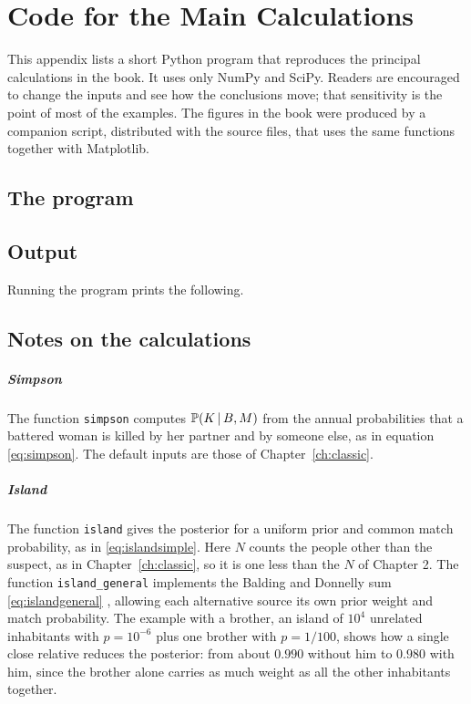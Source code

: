 \chapter{Code for the Main Calculations}
\label{app:code}

This appendix lists a short Python program that reproduces the principal calculations in the book. It uses only NumPy and SciPy. Readers are encouraged to change the inputs and see how the conclusions move; that sensitivity is the point of most of the examples. The figures in the book were produced by a companion script, distributed with the source files, that uses the same functions together with Matplotlib.

\section{The program}



\section{Output}

Running the program prints the following.



\section{Notes on the calculations}

\paragraph{Simpson} The function \texttt{simpson} computes $\mathbb{P}(K\,\vert\, B, M)$ from the annual probabilities that a battered woman is killed by her partner and by someone else, as in equation \eqref{eq:simpson}. The default inputs are those of Chapter~\ref{ch:classic}.

\paragraph{Island} The function \texttt{island} gives the posterior for a uniform prior and common match probability, as in \eqref{eq:islandsimple}. Here $N$ counts the people other than the suspect, as in Chapter~\ref{ch:classic}, so it is one less than the $N$ of Chapter 2. The function \texttt{island\_general} implements the Balding and Donnelly sum \eqref{eq:islandgeneral} \citep{balding1995}, allowing each alternative source its own prior weight and match probability. The example with a brother, an island of $10^4$ unrelated inhabitants with $p = 10^{-6}$ plus one brother with $p = 1/100$, shows how a single close relative reduces the posterior: from about $0.990$ without him to $0.980$ with him, since the brother alone carries as much weight as all the other inhabitants together.

